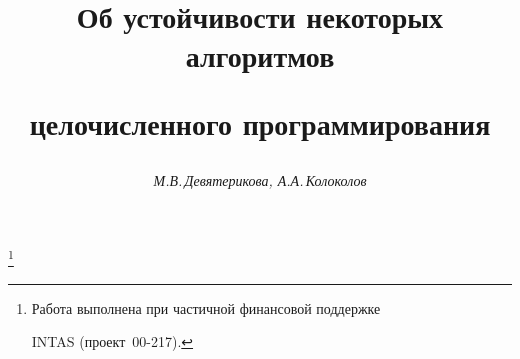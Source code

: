 




% 





\newcommand{\rank}{\operatorname{rank}}


\newcommand{\rec}{\operatorname{rec}}


\newcommand{\lexmax}{\operatorname{lexmax}}


\renewcommand{\baselinestretch}{0.97}


\newcommand{\tts}[1]{}










\setcounter{page}{41}















\author{\it М.В.\,Девятерикова, А.А.\,Колоколов}




\title{Об устойчивости некоторых алгоритмов 


целочисленного программирования}


\thanks{Работа выполнена при частичной финансовой поддержке


INTAS (проект \No\,00-217).}





\date{}




\pagestyle{plain} %






